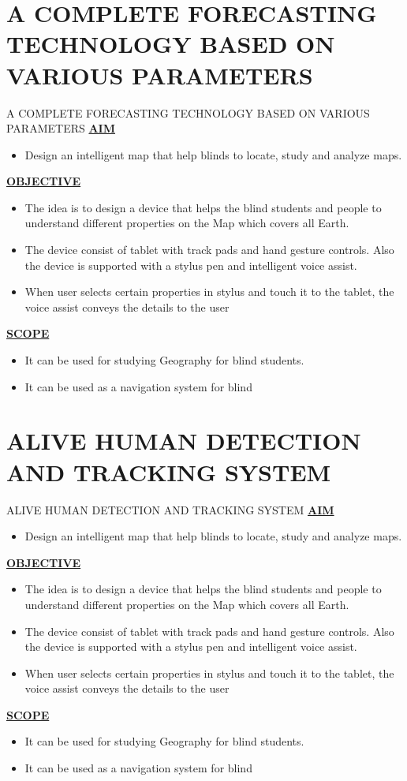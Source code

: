 \documentclass[svgnames,9pt]{beamer}
\begin{document}
\section{A COMPLETE FORECASTING TECHNOLOGY BASED ON VARIOUS PARAMETERS}
\begin{frame}{A COMPLETE FORECASTING TECHNOLOGY BASED ON VARIOUS PARAMETERS}
	\underline{\textbf{AIM}}
	\begin{itemize}
		\item Design an intelligent map that help blinds to locate, study and analyze maps.
	\end{itemize}
	\underline{\textbf{OBJECTIVE}}
	\begin{itemize}
		\item The idea is to design a device that helps the blind students and people to
		understand different properties on the Map which covers all Earth.
		\item The device consist of tablet with track pads and hand gesture controls. Also
		the device is supported with a stylus pen and intelligent voice assist.
		\item When user selects certain properties in stylus and touch it to the tablet, the
		voice assist conveys the details to the user
	\end{itemize}
	\underline{\textbf{SCOPE}}
	\begin{itemize}
		\item It can be used for studying Geography for blind students.
		\item It can be used as a navigation system for blind
	\end{itemize}
\end{frame}
\section{ALIVE HUMAN DETECTION AND TRACKING SYSTEM}
\begin{frame}{ALIVE HUMAN DETECTION AND TRACKING SYSTEM}
	\underline{\textbf{AIM}}
	\begin{itemize}
		\item Design an intelligent map that help blinds to locate, study and analyze maps.
	\end{itemize}
	\underline{\textbf{OBJECTIVE}}
	\begin{itemize}
		\item The idea is to design a device that helps the blind students and people to
		understand different properties on the Map which covers all Earth.
		\item The device consist of tablet with track pads and hand gesture controls. Also
		the device is supported with a stylus pen and intelligent voice assist.
		\item When user selects certain properties in stylus and touch it to the tablet, the
		voice assist conveys the details to the user
	\end{itemize}
	\underline{\textbf{SCOPE}}
	\begin{itemize}
		\item It can be used for studying Geography for blind students.
		\item It can be used as a navigation system for blind
	\end{itemize}
\end{frame}
\end{document}
